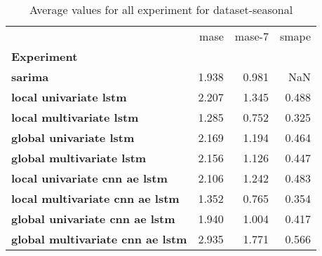 \begin{table}[h]
\centering
\caption{Average values for all experiment for dataset-seasonal}
\label{table:Average-metric-dataset-seasonal}
\begin{tabular}{lrrr}
\toprule
{} &   mase &  mase-7 &  smape \\
\textbf{Experiment                     } &        &         &        \\
\midrule
\textbf{sarima                         } &  1.938 &   0.981 &    NaN \\
\textbf{local univariate lstm          } &  2.207 &   1.345 &  0.488 \\
\textbf{local multivariate lstm        } &  1.285 &   0.752 &  0.325 \\
\textbf{global univariate lstm         } &  2.169 &   1.194 &  0.464 \\
\textbf{global multivariate lstm       } &  2.156 &   1.126 &  0.447 \\
\textbf{local univariate cnn ae lstm   } &  2.106 &   1.242 &  0.483 \\
\textbf{local multivariate cnn ae lstm } &  1.352 &   0.765 &  0.354 \\
\textbf{global univariate cnn ae lstm  } &  1.940 &   1.004 &  0.417 \\
\textbf{global multivariate cnn ae lstm} &  2.935 &   1.771 &  0.566 \\
\bottomrule
\end{tabular}
\end{table}
